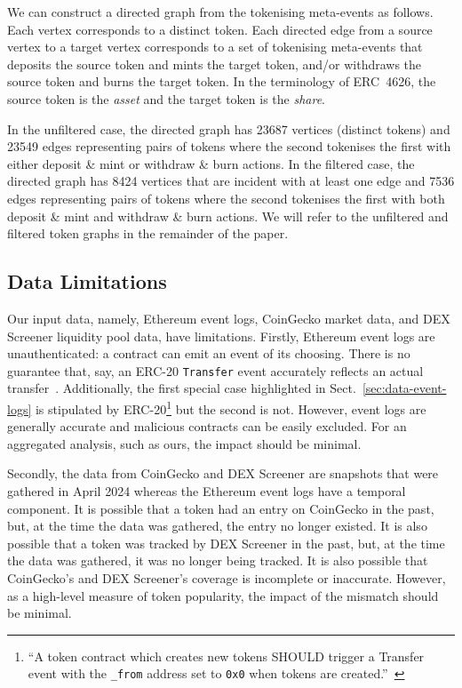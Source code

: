 We can construct a directed graph from the tokenising meta-events as
follows.  Each vertex corresponds to a distinct token.  Each directed
edge from a source vertex to a target vertex corresponds to a set of
tokenising meta-events that deposits the source token and mints the
target token, and/or withdraws the source token and burns the target
token.  In the terminology of ERC~4626, the source token is the
\textit{asset} and the target token is the \textit{share}.

In the unfiltered case, the directed graph has \num{23687} vertices
(distinct tokens) and \num{23549} edges representing pairs of tokens
where the second tokenises the first with either deposit \& mint or
withdraw \& burn actions.  In the filtered case, the directed graph
has \num{8424} vertices that are incident with at least one edge and
\num{7536} edges representing pairs of tokens where the second
tokenises the first with both deposit \& mint and withdraw \& burn
actions.  We will refer to the unfiltered and filtered token graphs in
the remainder of the paper.

\subsection{Data Limitations}\label{sec:data-limitations}

Our input data, namely, Ethereum event logs, CoinGecko market data,
and DEX Screener liquidity pool data, have limitations.  Firstly,
Ethereum event logs are unauthenticated: a contract can emit an event
of its choosing.  There is no guarantee that, say, an ERC-20
\texttt{Transfer} event accurately reflects an actual
transfer~\cite{guidi-michienzi-22}.  Additionally, the first special
case highlighted in Sect.~\ref{sec:data-event-logs} is stipulated by
ERC-20\footnote{``A token contract which creates new tokens SHOULD
trigger a Transfer event with the \texttt{\_from} address set to
\texttt{0x0} when tokens are
created.''~\cite{vogelsteller-buterin-15}} but the second is not.
However, event logs are generally accurate and malicious contracts can
be easily excluded.  For an aggregated analysis, such as ours, the
impact should be minimal.

Secondly, the data from CoinGecko and DEX Screener are snapshots that
were gathered in April 2024 whereas the Ethereum event logs have a
temporal component.  It is possible that a token had an entry on
CoinGecko in the past, but, at the time the data was gathered, the
entry no longer existed.  It is also possible that a token was tracked
by DEX Screener in the past, but, at the time the data was gathered,
it was no longer being tracked.  It is also possible that CoinGecko's
and DEX Screener's coverage is incomplete or inaccurate.  However, as
a high-level measure of token popularity, the impact of the mismatch
should be minimal.

